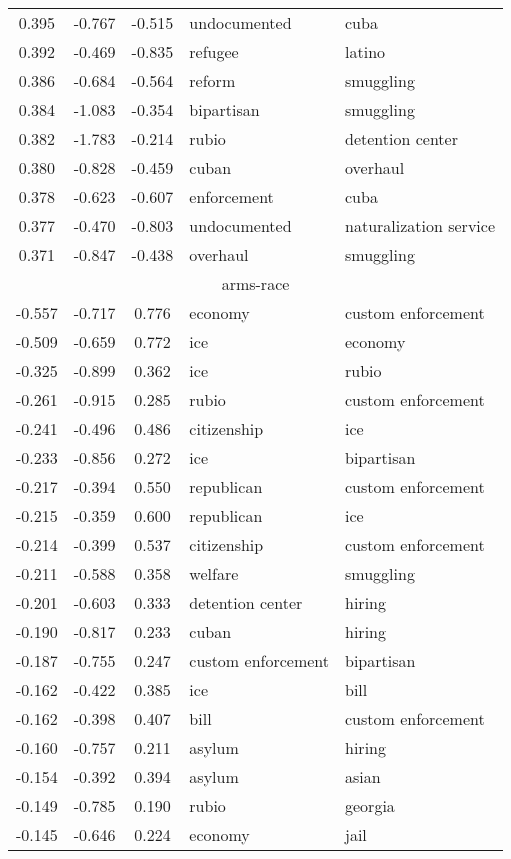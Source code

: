 \begin{tabular}{cccp{5cm}p{5cm}}
0.395 & -0.767 & -0.515 & undocumented & cuba \\
0.392 & -0.469 & -0.835 & refugee & latino \\
0.386 & -0.684 & -0.564 & reform & smuggling \\
0.384 & -1.083 & -0.354 & bipartisan & smuggling \\
0.382 & -1.783 & -0.214 & rubio & detention center \\
0.380 & -0.828 & -0.459 & cuban & overhaul \\
0.378 & -0.623 & -0.607 & enforcement & cuba \\
0.377 & -0.470 & -0.803 & undocumented & naturalization service \\
0.371 & -0.847 & -0.438 & overhaul & smuggling \\
\midrule
\multicolumn{5}{c}{arms-race}\\
-0.557 & -0.717 & 0.776 & economy & custom enforcement \\
-0.509 & -0.659 & 0.772 & ice & economy \\
-0.325 & -0.899 & 0.362 & ice & rubio \\
-0.261 & -0.915 & 0.285 & rubio & custom enforcement \\
-0.241 & -0.496 & 0.486 & citizenship & ice \\
-0.233 & -0.856 & 0.272 & ice & bipartisan \\
-0.217 & -0.394 & 0.550 & republican & custom enforcement \\
-0.215 & -0.359 & 0.600 & republican & ice \\
-0.214 & -0.399 & 0.537 & citizenship & custom enforcement \\
-0.211 & -0.588 & 0.358 & welfare & smuggling \\
-0.201 & -0.603 & 0.333 & detention center & hiring \\
-0.190 & -0.817 & 0.233 & cuban & hiring \\
-0.187 & -0.755 & 0.247 & custom enforcement & bipartisan \\
-0.162 & -0.422 & 0.385 & ice & bill \\
-0.162 & -0.398 & 0.407 & bill & custom enforcement \\
-0.160 & -0.757 & 0.211 & asylum & hiring \\
-0.154 & -0.392 & 0.394 & asylum & asian \\
-0.149 & -0.785 & 0.190 & rubio & georgia \\
-0.145 & -0.646 & 0.224 & economy & jail \\

\end{tabular}
